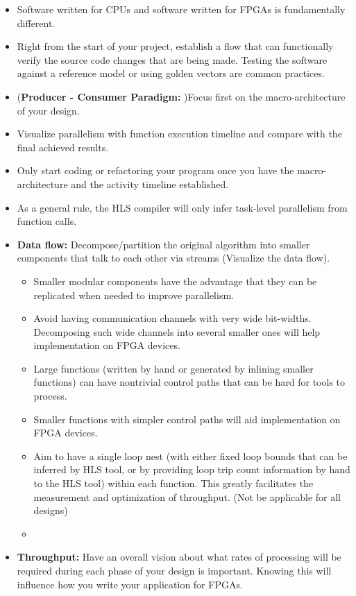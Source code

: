 \begin{itemize}
  \item Software written for CPUs and software written for FPGAs is fundamentally different. 
  \item Right from the start of your project, establish a flow that can functionally verify the source code changes that are being made. Testing the software against a reference model or using golden vectors are common practices.
  \item (\textbf{Producer - Consumer Paradigm: })Focus first on the macro-architecture of your design.
  \item Visualize parallelism with function execution timeline and compare with the final achieved results.
  \item Only start coding or refactoring your program once you have the macro-architecture and the activity timeline established.
  \item As a general rule, the HLS compiler will only infer task-level parallelism from function calls.
  \item \textbf{Data flow: } Decompose/partition the original algorithm into smaller components that talk to each other via streams (Visualize the data flow).
  \begin{itemize}
    \item Smaller modular components have the advantage that they can be replicated when needed to improve parallelism.
    \item Avoid having communication channels with very wide bit-widths. Decomposing such wide channels into several smaller ones will help implementation on FPGA devices.
    \item Large functions (written by hand or generated by inlining smaller functions) can have nontrivial control paths that can be hard for tools to process.
    \item Smaller functions with simpler control paths will aid implementation on FPGA devices.
    \item Aim to have a single loop nest (with either fixed loop bounds that can be inferred by HLS tool, or by providing loop trip count information by hand to the HLS tool) within each function. This greatly facilitates the measurement and optimization of throughput. (Not be applicable for all designs)
    \item 
  \end{itemize}
  \item \textbf{Throughput: } Have an overall vision about what rates of processing will be required during each phase of your design is important. Knowing this will influence how you write your application for FPGAs.

\end{itemize}
